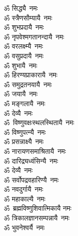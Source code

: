 \begin{multicols}{2}
\begin{flushleft}
ॐ सिद्ध्यै~नमः\\
ॐ स्त्रैणसौम्यायै~नमः\\
ॐ शुभप्रदायै~नमः\\
ॐ नृपवेश्मगतानन्दायै~नमः\\
ॐ वरलक्ष्म्यै~नमः\\
ॐ वसुप्रदायै~नमः\hfill{}\\
ॐ शुभायै~नमः\\
ॐ हिरण्यप्राकारायै~नमः\\
ॐ समुद्रतनयायै~नमः\\
ॐ जयायै~नमः\\
ॐ मङ्गलायै~नमः\\
ॐ देव्यै~नमः\\
ॐ~विष्णुवक्षःस्थल\-स्थितायै~नमः\\
ॐ विष्णुपत्न्यै~नमः\\
ॐ प्रसन्नाक्ष्यै~नमः\\
ॐ नारायणसमाश्रितायै~नमः\hfill{}\\
ॐ दारिद्र्यध्वंसिन्यै~नमः\\
ॐ देव्यै~नमः\\
ॐ सर्वोपद्रवहारिण्यै~नमः\\
ॐ नवदुर्गायै~नमः\\
ॐ महाकाल्यै~नमः\\
ॐ~ब्रह्मविष्णुशिवात्मिकायै नमः\\
ॐ त्रिकालज्ञानसम्पन्नायै~नमः\\
ॐ भुवनेश्वर्यै~नमः\\
\end{flushleft}
\end{multicols}


